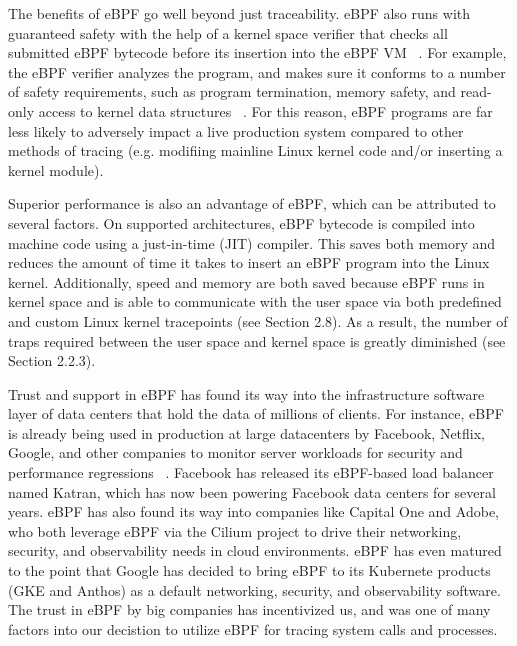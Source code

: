\documentclass{report}
\begin{document}
\begin{spacing}{1.5}
{\large
\noindent The benefits of eBPF go well beyond just traceability. eBPF also runs with guaranteed safety with the help of a kernel space verifier that checks all submitted eBPF bytecode before its insertion into the eBPF VM ~\cite{findlay2021practical}. For example, the eBPF verifier analyzes the program, and makes sure it conforms to a number of safety requirements, such as program termination, memory safety, and read-only access to kernel data structures ~\cite{findlay2021practical}. For this reason, eBPF programs are far less likely to adversely impact a live production system compared to other methods of tracing (e.g. modifiing mainline Linux kernel code and/or inserting a kernel module).
\newline
}

{\large
\noindent Superior performance is also an advantage of eBPF, which can be attributed to several factors. On supported architectures, eBPF bytecode is compiled into machine code using a just-in-time (JIT) compiler. This saves both memory and reduces the amount of time it takes to insert an eBPF program into the Linux kernel. Additionally, speed and memory are both saved because eBPF runs in kernel space and is able to communicate with the user space via both predefined and custom Linux kernel tracepoints (see Section 2.8). As a result, the number of traps required between the user space and kernel space is greatly diminished (see Section 2.2.3).
\newline
}

{\large
\noindent Trust and support in eBPF has found its way into the infrastructure software layer of data centers that hold the data of millions of clients. For instance, eBPF is already being used in production at large datacenters by Facebook, Netflix, Google, and other companies to monitor server workloads for security and performance regressions ~\cite{case2021fixing}. Facebook has released its eBPF-based load balancer named Katran, which has now been powering Facebook data centers for several years. eBPF has also found its way into companies like Capital One and Adobe, who both leverage eBPF via the Cilium project to drive their networking, security, and observability needs in cloud environments. eBPF has even matured to the point that Google has decided to bring eBPF to its Kubernete products (GKE and Anthos) as a default networking, security, and observability software. The trust in eBPF by big companies has incentivized us, and was one of many factors into our decistion to utilize eBPF for tracing system calls and processes.
\newline
}














\end{spacing}
\end{document}
